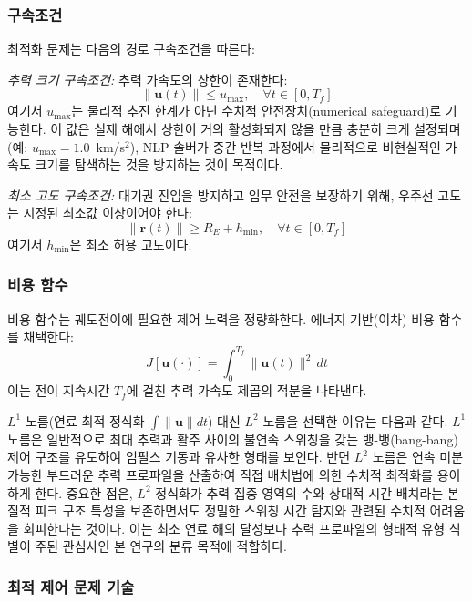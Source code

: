 \documentclass[a4paper,fleqn]{cas-dc}
\begin{document}
\subsubsection{구속조건}

최적화 문제는 다음의 경로 구속조건을 따른다:

\textit{추력 크기 구속조건:} 추력 가속도의 상한이 존재한다:
\begin{equation}
\|\mathbf{u}(t)\| \leq u_{\max}, \quad \forall t \in [0, T_f]
\end{equation}
여기서 $u_{\max}$는 물리적 추진 한계가 아닌 수치적 안전장치(numerical safeguard)로 기능한다. 이 값은 실제 해에서 상한이 거의 활성화되지 않을 만큼 충분히 크게 설정되며(예: $u_{\max} = 1.0$~km/s$^2$), NLP 솔버가 중간 반복 과정에서 물리적으로 비현실적인 가속도 크기를 탐색하는 것을 방지하는 것이 목적이다.

\textit{최소 고도 구속조건:} 대기권 진입을 방지하고 임무 안전을 보장하기 위해, 우주선 고도는 지정된 최소값 이상이어야 한다:
\begin{equation}
\|\mathbf{r}(t)\| \geq R_E + h_{\min}, \quad \forall t \in [0, T_f]
\end{equation}
여기서 $h_{\min}$은 최소 허용 고도이다.

\subsubsection{비용 함수}

비용 함수는 궤도전이에 필요한 제어 노력을 정량화한다. 에너지 기반(이차) 비용 함수를 채택한다:
\begin{equation}\label{eq:cost_function}
J[\mathbf{u}(\cdot)] = \int_0^{T_f} \|\mathbf{u}(t)\|^2 \, dt
\end{equation}
이는 전이 지속시간 $T_f$에 걸친 추력 가속도 제곱의 적분을 나타낸다.

$L^1$ 노름(연료 최적 정식화 $\int \|\mathbf{u}\| dt$) 대신 $L^2$ 노름을 선택한 이유는 다음과 같다. $L^1$ 노름은 일반적으로 최대 추력과 활주 사이의 불연속 스위칭을 갖는 뱅-뱅(bang-bang) 제어 구조를 유도하여 임펄스 기동과 유사한 형태를 보인다. 반면 $L^2$ 노름은 연속 미분 가능한 부드러운 추력 프로파일을 산출하여 직접 배치법에 의한 수치적 최적화를 용이하게 한다. 중요한 점은, $L^2$ 정식화가 추력 집중 영역의 수와 상대적 시간 배치라는 본질적 피크 구조 특성을 보존하면서도 정밀한 스위칭 시간 탐지와 관련된 수치적 어려움을 회피한다는 것이다. 이는 최소 연료 해의 달성보다 추력 프로파일의 형태적 유형 식별이 주된 관심사인 본 연구의 분류 목적에 적합하다.

\subsubsection{최적 제어 문제 기술}
\end{document}
